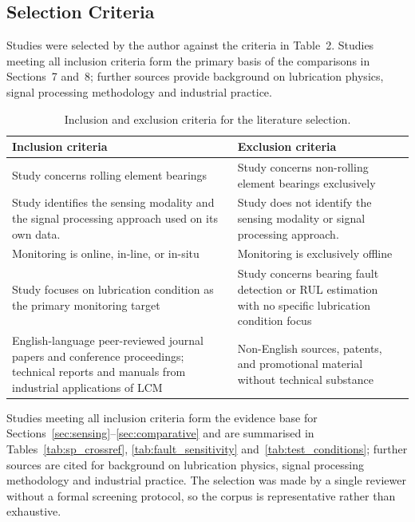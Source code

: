 \subsection{Selection Criteria}
Studies were selected by the author against the criteria in Table~2. Studies meeting all inclusion criteria form the primary basis of the comparisons in Sections~7 and~8; further sources provide background on lubrication physics, signal processing methodology and industrial practice.
\label{subsec:criteria}
\begin{table}[H]
\scriptsize
\centering
\renewcommand{\arraystretch}{1.4}
\setlength{\tabcolsep}{4pt}
\begin{tabularx}{\linewidth}{
>{\raggedright\arraybackslash}X
 >{\raggedright\arraybackslash}X }
\toprule
\textbf{Inclusion criteria} & \textbf{Exclusion criteria} \\
\midrule
Study concerns rolling element bearings & Study concerns non-rolling element bearings exclusively \\
\cmidrule{1-2}
Study identifies the sensing modality and the signal processing approach used on its own data. & Study does not identify the sensing modality or signal processing approach. \\
\cmidrule{1-2}
Monitoring is online, in-line, or in-situ & Monitoring is exclusively offline \\
\cmidrule{1-2}
Study focuses on lubrication condition as the primary monitoring target & Study concerns bearing fault detection or RUL estimation with no specific lubrication condition focus \\
\cmidrule{1-2}
English-language peer-reviewed journal papers and conference proceedings; technical reports and manuals from industrial applications of LCM & Non-English sources, patents, and promotional material without technical substance \\
\bottomrule
\end{tabularx}
\caption{Inclusion and exclusion criteria for the literature selection.}
\label{tab:criteria}
\end{table}

Studies meeting all inclusion criteria form the evidence base for Sections~\ref{sec:sensing}--\ref{sec:comparative} and are summarised in Tables~\ref{tab:sp_crossref}, \ref{tab:fault_sensitivity} and~\ref{tab:test_conditions}; further sources are cited for background on lubrication physics, signal processing methodology and industrial practice. The selection was made by a single reviewer without a formal screening protocol, so the corpus is representative rather than exhaustive.

